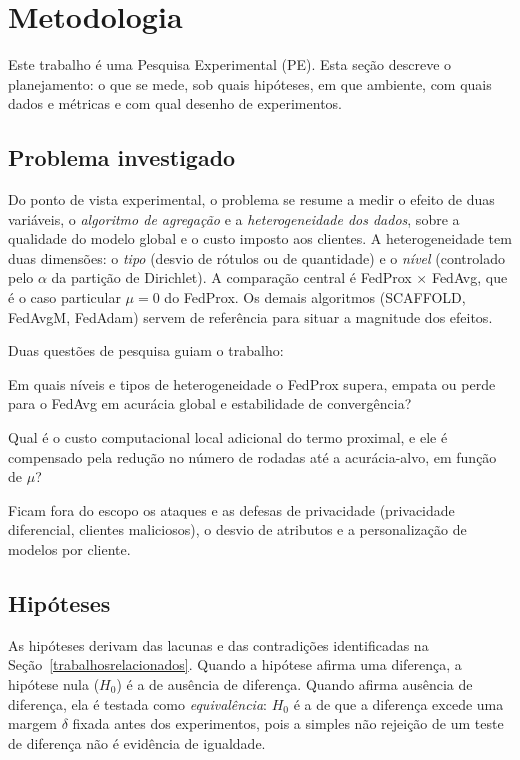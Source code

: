 \section{Metodologia}
\label{metodologia}

Este trabalho é uma Pesquisa Experimental (PE). Esta seção descreve o planejamento: o que se mede, sob quais hipóteses, em que ambiente, com quais dados e métricas e com qual desenho de experimentos.

\subsection{Problema investigado}

Do ponto de vista experimental, o problema se resume a medir o efeito de duas variáveis, o \emph{algoritmo de agregação} e a \emph{heterogeneidade dos dados}, sobre a qualidade do modelo global e o custo imposto aos clientes. A heterogeneidade tem duas dimensões: o \emph{tipo} (desvio de rótulos ou de quantidade) e o \emph{nível} (controlado pelo $\alpha$ da partição de Dirichlet). A comparação central é FedProx × FedAvg, que é o caso particular $\mu = 0$ do FedProx. Os demais algoritmos (SCAFFOLD, FedAvgM, FedAdam) servem de referência para situar a magnitude dos efeitos.

Duas questões de pesquisa guiam o trabalho:

\begin{description}[leftmargin=0pt, itemsep=2pt]
    \item[QP1.] Em quais níveis e tipos de heterogeneidade o FedProx supera, empata ou perde para o FedAvg em acurácia global e estabilidade de convergência?
    \item[QP2.] Qual é o custo computacional local adicional do termo proximal, e ele é compensado pela redução no número de rodadas até a acurácia-alvo, em função de $\mu$?
\end{description}

Ficam fora do escopo os ataques e as defesas de privacidade (privacidade diferencial, clientes maliciosos), o desvio de atributos e a personalização de modelos por cliente.

\subsection{Hipóteses}

As hipóteses derivam das lacunas e das contradições identificadas na Seção~\ref{trabalhosrelacionados}. Quando a hipótese afirma uma diferença, a hipótese nula ($H_0$) é a de ausência de diferença. Quando afirma ausência de diferença, ela é testada como \emph{equivalência}: $H_0$ é a de que a diferença excede uma margem $\delta$ fixada antes dos experimentos, pois a simples não rejeição de um teste de diferença não é evidência de igualdade.


